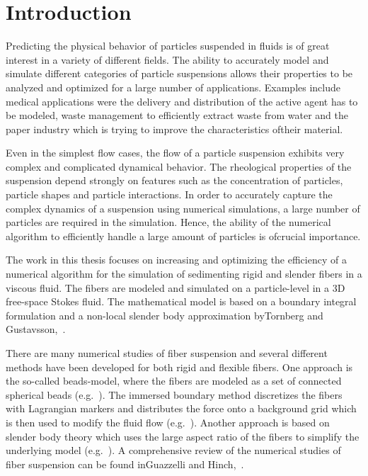 \chapter{Introduction}

Predicting the physical behavior of particles suspended in fluids is of great interest in a variety of different fields. The ability to accurately model and simulate different categories of particle suspensions allows their properties to be analyzed and optimized for a large number of applications. Examples include medical applications were the delivery and distribution of the active agent has to be modeled, waste management to efficiently extract waste from water and the paper industry which is trying to improve the characteristics of\linebreak their material.

Even in the simplest flow cases, the flow of a particle suspension exhibits very complex and complicated dynamical behavior. The rheological properties of the suspension depend strongly on features such as the concentration of particles, particle shapes and particle interactions. In order to accurately capture the complex dynamics of a suspension using numerical simulations, a large number of particles are required in the simulation. Hence, the ability of the numerical algorithm to efficiently handle a large amount of particles is of\linebreak crucial importance.

The work in this thesis focuses on increasing and optimizing the efficiency of a numerical algorithm for the simulation of sedimenting rigid and slender fibers in a viscous fluid. The fibers are modeled and simulated on a particle-level in a 3D free-space Stokes fluid. The mathematical model is based on a boundary integral formulation and a non-local slender body approximation by\linebreak Tornberg and Gustavsson,~\cite{Tornberg2006}.

\pagebreak
There are many numerical studies of fiber suspension and several different methods have been developed for both rigid and flexible fibers. One approach is the so-called beads-model, where the fibers are modeled as a set of connected spherical beads (e.g.~\cite{Fan1998}\cite{Joung2001}\cite{Skjetne1997}\cite{Yamamoto1995}). The immersed boundary method discretizes the fibers with Lagrangian markers and distributes the force onto a background grid which is then used to modify the fluid flow (e.g.~\cite{Peskin2002}\cite{Stockie1998}). Another approach is based on slender body theory which uses the large aspect ratio of the fibers to simplify the underlying model (e.g.~\cite{Gustavsson2009}\cite{Tornberg2006}\cite{Tornberg2004}). A comprehensive review of the numerical studies of fiber suspension can be found in\linebreak Guazzelli and Hinch,~\cite{Guazzelli2011}.

